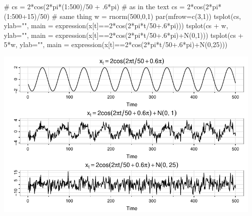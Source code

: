 \documentclass[
  letterpaper,
  DIV=11,
  numbers=noendperiod]{scrreprt}
\newenvironment{Shaded}{\begin{snugshade}}{\end{snugshade}}
\newcommand{\AttributeTok}[1]{\textcolor[rgb]{0.40,0.45,0.13}{#1}}
\newcommand{\CommentTok}[1]{\textcolor[rgb]{0.37,0.37,0.37}{#1}}
\newcommand{\DecValTok}[1]{\textcolor[rgb]{0.68,0.00,0.00}{#1}}
\newcommand{\FloatTok}[1]{\textcolor[rgb]{0.68,0.00,0.00}{#1}}
\newcommand{\FunctionTok}[1]{\textcolor[rgb]{0.28,0.35,0.67}{#1}}
\newcommand{\NormalTok}[1]{\textcolor[rgb]{0.00,0.23,0.31}{#1}}
\newcommand{\OtherTok}[1]{\textcolor[rgb]{0.00,0.23,0.31}{#1}}
\newcommand{\SpecialCharTok}[1]{\textcolor[rgb]{0.37,0.37,0.37}{#1}}
\newcommand{\StringTok}[1]{\textcolor[rgb]{0.13,0.47,0.30}{#1}}
\begin{document}
\begin{Shaded}
\begin{Highlighting}[]
\CommentTok{\# cs = 2*cos(2*pi*(1:500)/50 + .6*pi)    \# as in the text}
\NormalTok{cs }\OtherTok{=} \DecValTok{2}\SpecialCharTok{*}\FunctionTok{cos}\NormalTok{(}\DecValTok{2}\SpecialCharTok{*}\NormalTok{pi}\SpecialCharTok{*}\NormalTok{(}\DecValTok{1}\SpecialCharTok{:}\DecValTok{500}\SpecialCharTok{+}\DecValTok{15}\NormalTok{)}\SpecialCharTok{/}\DecValTok{50}\NormalTok{)           }\CommentTok{\# same thing }
\NormalTok{w  }\OtherTok{=} \FunctionTok{rnorm}\NormalTok{(}\DecValTok{500}\NormalTok{,}\DecValTok{0}\NormalTok{,}\DecValTok{1}\NormalTok{)}
\FunctionTok{par}\NormalTok{(}\AttributeTok{mfrow=}\FunctionTok{c}\NormalTok{(}\DecValTok{3}\NormalTok{,}\DecValTok{1}\NormalTok{))   }
\FunctionTok{tsplot}\NormalTok{(cs, }\AttributeTok{ylab=}\StringTok{""}\NormalTok{, }\AttributeTok{main =} \FunctionTok{expression}\NormalTok{(x[t]}\SpecialCharTok{==}\DecValTok{2}\SpecialCharTok{*}\FunctionTok{cos}\NormalTok{(}\DecValTok{2}\SpecialCharTok{*}\NormalTok{pi}\SpecialCharTok{*}\NormalTok{t}\SpecialCharTok{/}\DecValTok{50}\FloatTok{+.6}\SpecialCharTok{*}\NormalTok{pi)))}
\FunctionTok{tsplot}\NormalTok{(cs }\SpecialCharTok{+}\NormalTok{ w, }\AttributeTok{ylab=}\StringTok{""}\NormalTok{, }\AttributeTok{main =} \FunctionTok{expression}\NormalTok{(x[t]}\SpecialCharTok{==}\DecValTok{2}\SpecialCharTok{*}\FunctionTok{cos}\NormalTok{(}\DecValTok{2}\SpecialCharTok{*}\NormalTok{pi}\SpecialCharTok{*}\NormalTok{t}\SpecialCharTok{/}\DecValTok{50}\FloatTok{+.6}\SpecialCharTok{*}\NormalTok{pi)}\SpecialCharTok{+}\FunctionTok{N}\NormalTok{(}\DecValTok{0}\NormalTok{,}\DecValTok{1}\NormalTok{)))}
\FunctionTok{tsplot}\NormalTok{(cs }\SpecialCharTok{+} \DecValTok{5}\SpecialCharTok{*}\NormalTok{w, }\AttributeTok{ylab=}\StringTok{""}\NormalTok{, }\AttributeTok{main =} \FunctionTok{expression}\NormalTok{(x[t]}\SpecialCharTok{==}\DecValTok{2}\SpecialCharTok{*}\FunctionTok{cos}\NormalTok{(}\DecValTok{2}\SpecialCharTok{*}\NormalTok{pi}\SpecialCharTok{*}\NormalTok{t}\SpecialCharTok{/}\DecValTok{50}\FloatTok{+.6}\SpecialCharTok{*}\NormalTok{pi)}\SpecialCharTok{+}\FunctionTok{N}\NormalTok{(}\DecValTok{0}\NormalTok{,}\DecValTok{25}\NormalTok{)))}
\end{Highlighting}
\end{Shaded}

\includegraphics{LectureNotes/Lecture1_files/figure-pdf/signal-plus-noise-1.pdf}
\end{document}
